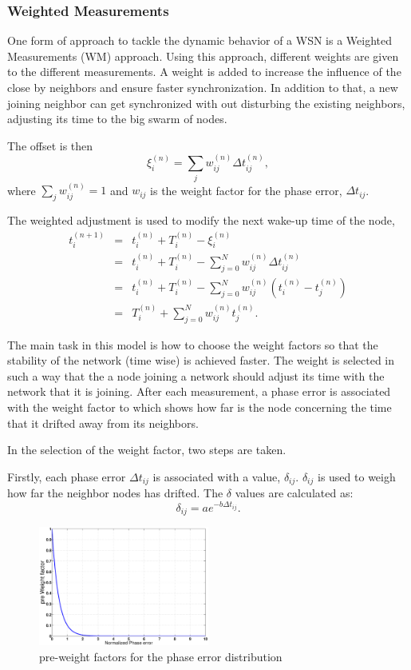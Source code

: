 \documentclass[journal]{IEEEtran}
\begin{document}
\subsubsection{\textbf{Weighted Measurements}}
One form of approach to tackle the dynamic behavior of a WSN is a
Weighted Measurements (WM) approach. Using this approach, different
weights are given to the different measurements. A weight is added to
increase the influence of the close by neighbors and ensure
faster synchronization. In addition to that, a new joining neighbor
can get synchronized with out disturbing the existing neighbors,
adjusting its time to the big swarm of nodes.\par
The offset is then
\begin{equation}
\xi_i^{(n)} = \sum_j{w_{ij}^{(n)}\Delta t_{ij}^{(n)}} ,
\end{equation}
where $\sum_j{w_{ij}^{(n)}= 1}$ and $w_{ij}$ is the weight factor
for the phase error, $\Delta t_{ij}$.
\par
The weighted adjustment is used to modify the next wake-up time of
the node,
\begin{eqnarray*}
t_i^{(n+1)} &=& t_i^{(n)} + T_i^{(n)} - \xi_i^{(n)} \\ &=& t_i^{(n)}
+ T_i^{(n)} - \sum_{j=0}^N{w_{ij}^{(n)}\Delta t_{ij}^{(n)}} \\ &=&
t_i^{(n)}+ T_i^{(n)} -
\sum_{j=0}^N{w_{ij}^{(n)}(t_i^{(n)}-t_j^{(n)})} \\ &=& T_i^{(n)} + \sum_{j=0}^N{w_{ij}^{(n)}t_j^{(n)}}.
\end{eqnarray*}
\par
The main task in this model is how to choose the weight factors
so that the stability of the network (time wise) is achieved faster. The weight is selected in such a way that the a node
joining a network should adjust its time with the network that it is
joining. After each measurement, a phase error is associated with
the weight  factor to which shows how far is the node concerning the
time that it drifted away from its neighbors.
\par \noindent In the selection of the weight factor, two steps are taken. \par \noindent
Firstly, each phase error $\Delta t_{ij}$ is associated with a value, $\delta_{ij}$. $\delta_{ij}$ is used to weigh how far the neighbor nodes has drifted. The $\delta$ values are calculated as:
\begin{equation}
\delta_{ij} = ae^{-b\Delta t_{ij}}.
\end{equation}
\begin{figure}[t]
\centering
\includegraphics[width= 0.5\textwidth]{weightphase}
\caption{pre-weight factors for the phase error distribution}
\label{weight}
\end{figure} \noindent
\end{document}
